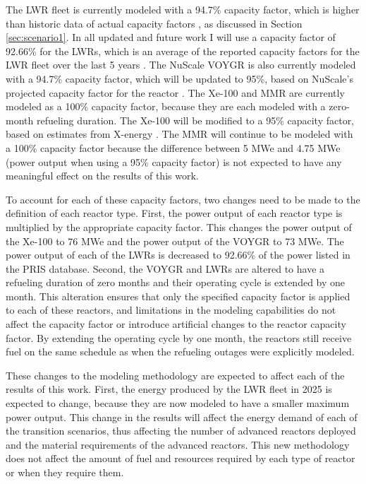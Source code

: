 The \gls{LWR} fleet is currently modeled with a 94.7\% capacity factor, 
which is higher than historic data of actual capacity factors 
\cite{us_eia_monthly_2022}, as discussed in Section \ref{sec:scenario1}.
In all updated and future work 
I will use a capacity factor of 92.66\% for the \glspl{LWR}, which 
is an average of the reported capacity factors for the \gls{LWR} fleet 
over the last 5 years \cite{noauthor_electric_2022}. The NuScale VOYGR 
is also currently modeled with 
a 94.7\% capacity factor, which will be updated to 95\%, based on 
NuScale's projected capacity factor for the reactor 
\cite{nuscale_technology_nodate}. The Xe-100 and \gls{MMR} are currently 
modeled as a 100\% capacity factor, because they are each modeled with a 
zero-month refueling duration. The Xe-100 will be modified to a 95\% 
capacity factor, based on estimates from X-energy 
\cite{xenergy_reactor_nodate}. The \gls{MMR} will continue to be modeled 
with a 100\% capacity factor because the difference between 
5 MWe and 4.75 MWe (power output when using a 95\% capacity factor) is 
not expected to have any meaningful effect on the results of this work. 

To account for each of these capacity factors, two changes need to be 
made 
to the definition of each reactor type. First, the power output of each 
reactor type is multiplied by the appropriate capacity factor. This 
changes the power output of the Xe-100 to 76 MWe and the power output of 
the VOYGR to 73 MWe. The power output of each of the \glspl{LWR} is 
decreased to 92.66\% of the power listed in the \gls{PRIS} database. 
Second, the VOYGR and \glspl{LWR} are altered to have a refueling 
duration of zero months and their operating cycle is extended by one 
month. This alteration ensures that only the specified capacity factor 
is applied
to each of these reactors, and limitations in the modeling capabilities 
do not affect the capacity factor or introduce artificial changes to the 
reactor capacity factor. By extending the operating 
cycle by one month, the reactors still receive fuel on the same schedule 
as when the refueling outages were explicitly modeled. 

These changes to the modeling methodology are expected to affect each of 
the results of this work. First, the energy produced by the \gls{LWR} 
fleet in 
2025 is expected to change, because they are now modeled to have a 
smaller maximum power output. 
This change in the results will affect the energy demand of each of the 
transition scenarios, thus affecting the number of advanced reactors 
deployed and the material requirements of the advanced reactors. This 
new methodology does not affect the amount of fuel and resources required 
by each type of reactor or when they require them. 


